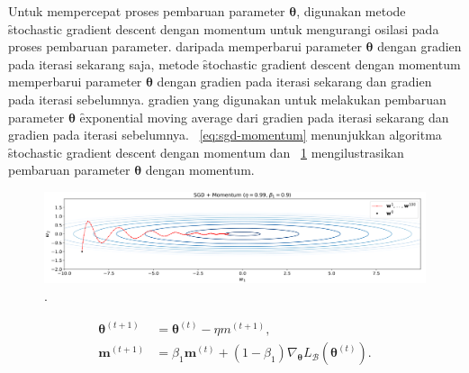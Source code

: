     Untuk mempercepat proses pembaruan parameter $\bm{\theta}$, digunakan metode \f{stochastic gradient descent} dengan momentum untuk mengurangi osilasi pada proses pembaruan parameter. daripada memperbarui parameter $\bm{\theta}$ dengan gradien pada iterasi sekarang saja, metode \f{stochastic gradient descent} dengan momentum memperbarui parameter $\bm{\theta}$ dengan gradien pada iterasi sekarang dan gradien pada iterasi sebelumnya. gradien yang digunakan untuk melakukan pembaruan parameter $\bm{\theta}$ \f{exponential moving average} dari gradien pada iterasi sekarang dan gradien pada iterasi sebelumnya. \equ~\ref{eq:sgd-momentum} menunjukkan algoritma \f{stochastic gradient descent} dengan momentum dan \pic~\ref{fig:sgd-momentum} mengilustrasikan pembaruan parameter $\bm{\theta}$ dengan momentum.
\begin{figure}
    \centering
    \includegraphics[width=1\textwidth]{assets/pics/sgd-momentum.png}
    \caption{\license.}
    \label{fig:sgd-momentum}
\end{figure}

\begin{align}
    \label{eq:sgd-momentum}
    \bm{\theta}^{(t+1)} &= \bm{\theta}^{(t)} - \eta m^{(t+1)}, \\
    \bm{m}^{(t+1)} &= \beta_1 \bm{m}^{(t)} + (1 - \beta_1) \nabla_{\bm{\theta}} L_{\mathcal{B}}(\bm{\theta}^{(t)}).
\end{align}


